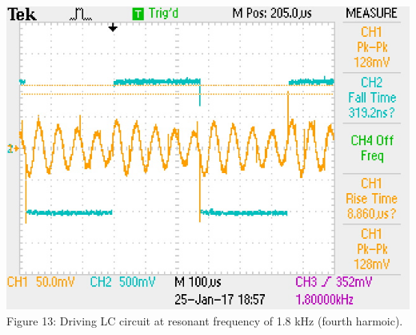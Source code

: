 \documentclass[]{article}
\begin{document}
		\begin{center}
			\includegraphics[scale=0.8]{e_18hz}\\
			Figure 13: Driving LC circuit at resonant frequency of 1.8 kHz (fourth harmoic).
		\end{center}
\end{document}

